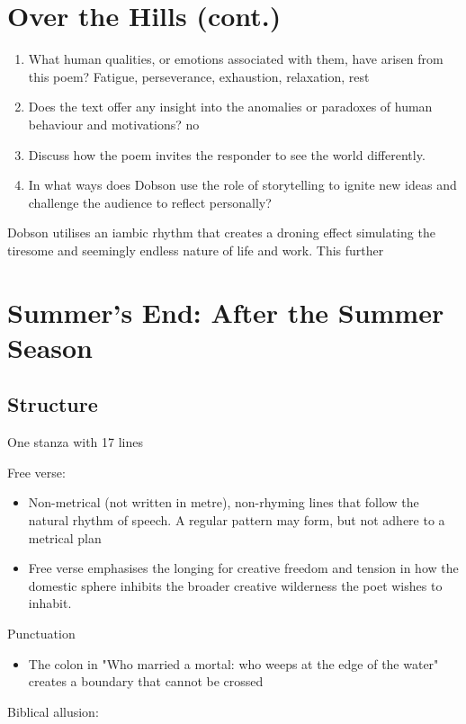 \section{Over the Hills (cont.)} \label{7/11/2024}
	\begin{enumerate}
		\item What human qualities, or emotions associated with them, have arisen from this poem?
			\subitem Fatigue, perseverance, exhaustion, relaxation, rest
		\item Does the text offer any insight into the anomalies or paradoxes of human behaviour and motivations?
			\subitem no
		\item Discuss how the poem invites the responder to see the world differently.
			\subitem
		\item In what ways does Dobson use the role of storytelling to ignite new ideas and challenge the audience to reflect personally?
	\end{enumerate}

	Dobson utilises an iambic rhythm that creates a droning effect simulating the tiresome and seemingly endless nature of life and work. This further
\newpage
\section{Summer's End: After the Summer Season} \label{13/11/2024}
	\subsection{Structure}
		One stanza with 17 lines

		Free verse:
		\begin{itemize}
			\item Non-metrical (not written in metre), non-rhyming lines that follow the natural rhythm of speech. A regular pattern may form, but not adhere to a metrical plan
			\item Free verse emphasises the longing for creative freedom and tension in how the domestic sphere inhibits the broader creative wilderness the poet wishes to inhabit.
		\end{itemize}

		Punctuation
		\begin{itemize}
			\item The colon in "Who married a mortal: who weeps at the edge of the water" creates a boundary that cannot be crossed
		\end{itemize}

		Biblical allusion:


